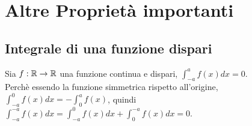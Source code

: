 \section{Altre Proprietà importanti}
\subsection*{Integrale di una funzione dispari}
Sia $f : \mathbb{R} \to \mathbb{R}$ una funzione continua e dispari,  $\int_{-a}^{a} f(x) dx = 0$.\\
Perchè essendo la funzione simmetrica rispetto all'origine, $\int_{-a}^{0} f(x) dx = - \int_{0}^{a} f(x)$, quindi
$\int_{-a}^{-a} f(x) dx = \int_{-a}^{0} f(x) dx + \int_{0}^{-a} f(x) dx = 0$.

